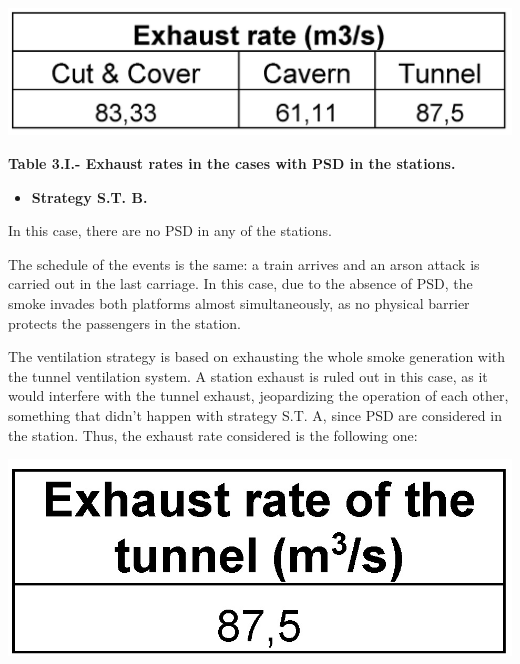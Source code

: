\documentclass{article}
\begin{document}
\begin{mdcenter}%

\noindent{}\includegraphics[keepaspectratio=true,width=\dimmin{}{\dimwidth{0.35}}]{images/Table-3.I}{}%
\end{mdcenter}%

\begin{mdcenter}%

\noindent{}\textbf{Table 3.I.- Exhaust rates in the cases with PSD in the stations.}%
\end{mdcenter}%

\begin{itemize}[noitemsep,topsep=\mdcompacttopsep]%

\item{}\textbf{Strategy S.T. B.}%
\end{itemize}%

\noindent{}In this case, there are no PSD in any of the stations.%

The schedule of the events is the same: a train arrives and an arson attack is 
carried out in the last carriage. In this case, due to the absence of PSD, the 
smoke invades both platforms almost simultaneously, as no physical barrier protects 
the passengers in the station.%

The ventilation strategy is based on exhausting the whole smoke generation with the 
tunnel ventilation system. A station exhaust is ruled out in this case, as it would 
interfere with the tunnel exhaust, jeopardizing the operation of each other, something 
that didn’t happen with strategy S.T. A, since PSD are considered in the station. 
Thus, the exhaust rate considered is the following one:%

\begin{mdcenter}%

\noindent{}\includegraphics[keepaspectratio=true,width=\dimmin{}{\dimwidth{0.22}}]{images/Table-3.II}{}%
\end{mdcenter}%
\end{document}

